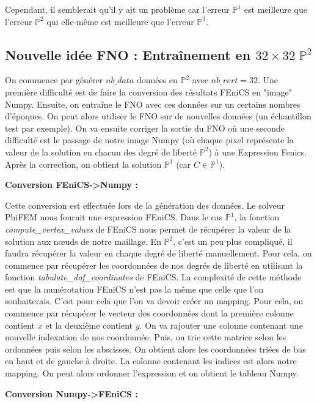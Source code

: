 Cependant, il semblerait qu'il y ait un problème car l'erreur $\mathbb{P}^1$ est meilleure que l'erreur $\mathbb{P}^2$ qui elle-même est meilleure que l'erreur $\mathbb{P}^3$.


\subsection{Nouvelle idée FNO : Entraînement en $32\times 32 \; \mathbb{P}^2$}

On commence par générer $nb\_data$ données en $\mathbb{P}^2$ avec $nb\_vert=32$. Une première difficulté est de faire la conversion des résultats FEniCS en "image" Numpy. Ensuite, on entraîne le FNO avec ces données sur un certains nombres d'époques. On peut alors utiliser le FNO sur de nouvelles données (un échantillon test par exemple). On va ensuite corriger la sortie du FNO où une seconde difficulté est le passage de notre image Numpy (où chaque pixel représente la valeur de la solution en chacun des degré de liberté $\mathbb{P}^2$) à une Expression Fenics. Après la correction, on obtient la solution $\mathbb{P}^1$ (car $C\in\mathbb{P}^1$).


\textbf{Conversion FEniCS->Numpy : }

Cette conversion est effectuée lors de la génération des données. Le solveur PhiFEM nous fournit une expression FEniCS. Dans le cas $\mathbb{P}^1$, la fonction \textit{compute\_vertex\_values} de FEniCS nous permet de récupérer la valeur de la solution aux nœuds de notre maillage. En $\mathbb{P}^2$, c'est un peu plus compliqué, il faudra récupérer la valeur en chaque degré de liberté manuellement. Pour cela, on commence par récupérer les coordonnées de nos degrés de liberté en utilisant la fonction \textit{tabulate\_dof\_coordinates} de FEniCS. La complexité de cette méthode est que la numérotation FEniCS n'est pas la même que celle que l'on souhaiterais. C'est pour cela que l'on va devoir créer un mapping. Pour cela, on commence par récupérer le vecteur des coordonnées dont la première colonne contient $x$ et la deuxième contient $y$. On va rajouter une colonne contenant une nouvelle indexation de nos coordonnée. Puis, on trie cette matrice selon les ordonnées puis selon les abscisses. On obtient alors les coordonnées triées de bas en haut et de gauche à droite. La colonne contenant les indices est alors notre mapping. On peut alors ordonner l'expression et on obtient le tableau Numpy.

\textbf{Conversion Numpy->FEniCS : }

